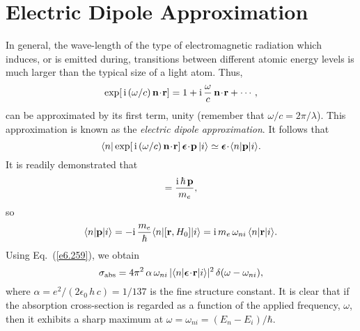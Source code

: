 \section{Electric Dipole Approximation}
In general, the wave-length of the type of
electromagnetic radiation which induces, or is emitted during, transitions
between different atomic energy levels is much larger than the 
typical size of
a light atom. Thus,
\begin{equation}\label{e6.260}
\exp[\,{\rm i}\,(\omega/c)\,{\bf n}\!\cdot\!{\bf r}] = 1
+ {\rm i}\,\frac{\omega}{c} \,{\bf n}\!\cdot\!{\bf r} + \cdots,
\end{equation}
can be approximated by its first term, unity (remember that $\omega/c =2\pi/\lambda$).
This approximation is known as the {\em electric dipole approximation}. 
It follows that
\begin{equation}
\langle n| \exp[\,{\rm i}\,(\omega/c)\,{\bf n}\!\cdot\!{\bf r}]\,
\mbox{\boldmath$\epsilon$}\!\cdot\!{\bf p}\, |i\rangle \simeq  \mbox{\boldmath$\epsilon$} \!\cdot\!
\langle n|{\bf p}|i\rangle.
\end{equation}
It is readily demonstrated that
\begin{equation}
[{\bf r}, H_0] = \frac{{\rm i}\, \hbar \,{\bf p}}{m_e},
\end{equation}
so
\begin{equation}
\langle n| {\bf p}|i\rangle = -{\rm i}\, \frac{m_e}{\hbar}
\langle n|[{\bf r}, H_0]|i\rangle 
= {\rm i}\,m_e\,\omega_{ni}\, \langle n|{\bf r}|i\rangle.
\end{equation}
Using Eq.~(\ref{e6.259}), we obtain 
\begin{equation}\label{e6.264}
\sigma_{\rm abs} = 4\pi^2\,\alpha \,\omega_{ni}\,|\langle n|\mbox{\boldmath$\epsilon$}
\!\cdot\!{\bf r}|i\rangle|^2\,\delta(\omega-\omega_{ni}),
\end{equation}
where $\alpha = e^2/(2\epsilon_0\, h \,c) = 1/137$ is the fine structure constant. 
It is clear that if the absorption cross-section is regarded as a function of
the applied frequency, $\omega$, then it exhibits a sharp maximum at
$\omega = \omega_{ni} =(E_n - E_i)/\hbar$. 

